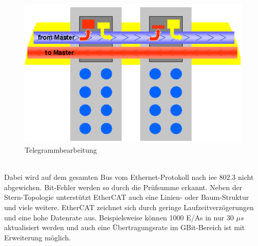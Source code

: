 \documentclass[ a4paper,
                oneside,
                toc=bibliography,
                toc=listof
                ]{scrbook}
\begin{document}
	\begin{figure}[!ht]
		\centering
		\includegraphics[width=0.7\linewidth]{./images/EtherCAT.png}
		\caption{Telegrammbearbeitung \cite{ethercat}}
		\label{fig:EtherCAT}
	\end{figure}\\
	Dabei wird auf dem gesamten Bus vom Ethernet-Protokoll nach \ac{iee} 802.3 nicht abgewichen. Bit-Fehler werden so durch die Prüfsumme erkannt. Neben der Stern-Topologie unterstützt EtherCAT auch eine Linien- oder Baum-Struktur und viele weitere.
	EtherCAT zeichnet sich durch geringe Laufzeitverzögerungen und eine hohe Datenrate aus. Beispielsweise können 1000 E/As in nur 30 \(\mu s\) aktualisiert werden und auch eine Übertragungsrate im GBit-Bereich ist mit Erweiterung möglich. \cite{ethercat}\\
	
	
\end{document}
